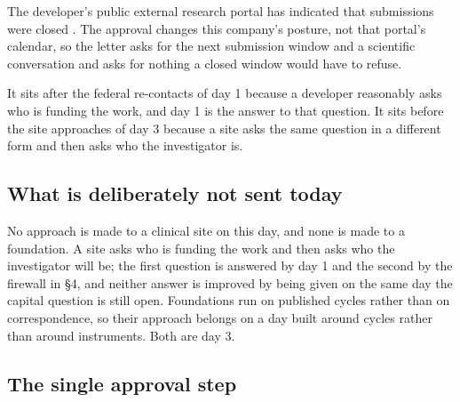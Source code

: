 The developer's public external research portal has indicated that submissions
were closed \cite{revmedexternal2026}. The approval changes this company's
posture, not that portal's calendar, so the letter asks for the next submission
window and a scientific conversation and asks for nothing a closed window would
have to refuse.

It sits after the federal re-contacts of day 1 because a developer reasonably
asks who is funding the work, and day 1 is the answer to that question. It sits
before the site approaches of day 3 because a site asks the same question in a
different form and then asks who the investigator is.

\subsection{What is deliberately not sent today}

No approach is made to a clinical site on this day, and none is made to a
foundation. A site asks who is funding the work and then asks who the
investigator will be; the first question is answered by day 1 and the second by
the firewall in \S4, and neither answer is improved by being given on the same
day the capital question is still open. Foundations run on published cycles
rather than on correspondence, so their approach belongs on a day built around
cycles rather than around instruments. Both are day 3.

\subsection{The single approval step}

